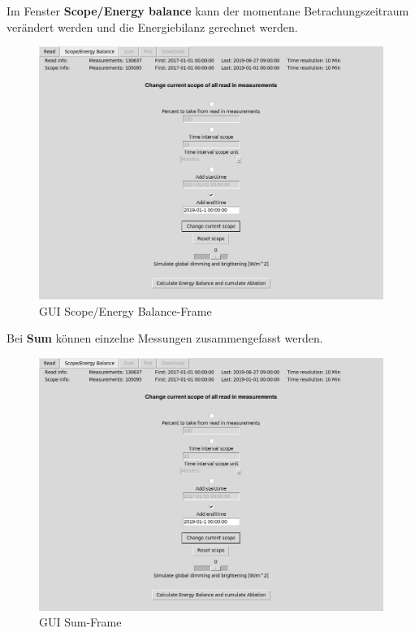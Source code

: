 \documentclass[12pt,a4paper]{article}
\begin{document}
Im Fenster \textbf{Scope/Energy balance} kann der momentane Betrachungszeitraum verändert werden und die Energiebilanz gerechnet werden. 

\begin{figure}[H]
\centering
\includegraphics[width=1\textwidth]{pictures/GUI/Scope_Energy_Balance_Frame.png}
\caption{GUI Scope/Energy Balance-Frame}
\label{fig:GUI Scope/Energy Balance-Frame}
\end{figure}

Bei \textbf{Sum} können einzelne Messungen zusammengefasst werden.

\begin{figure}[H]
\centering
\includegraphics[width=1\textwidth]{pictures/GUI/Scope_Energy_Balance_Frame.png}
\caption{GUI Sum-Frame}
\label{fig:GUI Sum-Frame}
\end{figure}
\end{document}
